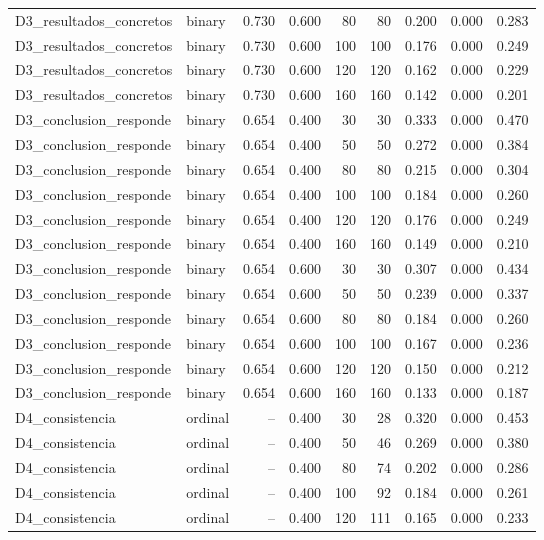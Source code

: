 \begin{table}
{\begin{tabular}{llrrrrrrr}
D3\_resultados\_concretos & binary & 0.730 & 0.600 & 80 & 80 & 0.200 & 0.000 & 0.283 \\
D3\_resultados\_concretos & binary & 0.730 & 0.600 & 100 & 100 & 0.176 & 0.000 & 0.249 \\
D3\_resultados\_concretos & binary & 0.730 & 0.600 & 120 & 120 & 0.162 & 0.000 & 0.229 \\
D3\_resultados\_concretos & binary & 0.730 & 0.600 & 160 & 160 & 0.142 & 0.000 & 0.201 \\
D3\_conclusion\_responde & binary & 0.654 & 0.400 & 30 & 30 & 0.333 & 0.000 & 0.470 \\
D3\_conclusion\_responde & binary & 0.654 & 0.400 & 50 & 50 & 0.272 & 0.000 & 0.384 \\
D3\_conclusion\_responde & binary & 0.654 & 0.400 & 80 & 80 & 0.215 & 0.000 & 0.304 \\
D3\_conclusion\_responde & binary & 0.654 & 0.400 & 100 & 100 & 0.184 & 0.000 & 0.260 \\
D3\_conclusion\_responde & binary & 0.654 & 0.400 & 120 & 120 & 0.176 & 0.000 & 0.249 \\
D3\_conclusion\_responde & binary & 0.654 & 0.400 & 160 & 160 & 0.149 & 0.000 & 0.210 \\
D3\_conclusion\_responde & binary & 0.654 & 0.600 & 30 & 30 & 0.307 & 0.000 & 0.434 \\
D3\_conclusion\_responde & binary & 0.654 & 0.600 & 50 & 50 & 0.239 & 0.000 & 0.337 \\
D3\_conclusion\_responde & binary & 0.654 & 0.600 & 80 & 80 & 0.184 & 0.000 & 0.260 \\
D3\_conclusion\_responde & binary & 0.654 & 0.600 & 100 & 100 & 0.167 & 0.000 & 0.236 \\
D3\_conclusion\_responde & binary & 0.654 & 0.600 & 120 & 120 & 0.150 & 0.000 & 0.212 \\
D3\_conclusion\_responde & binary & 0.654 & 0.600 & 160 & 160 & 0.133 & 0.000 & 0.187 \\
D4\_consistencia & ordinal & -- & 0.400 & 30 & 28 & 0.320 & 0.000 & 0.453 \\
D4\_consistencia & ordinal & -- & 0.400 & 50 & 46 & 0.269 & 0.000 & 0.380 \\
D4\_consistencia & ordinal & -- & 0.400 & 80 & 74 & 0.202 & 0.000 & 0.286 \\
D4\_consistencia & ordinal & -- & 0.400 & 100 & 92 & 0.184 & 0.000 & 0.261 \\
D4\_consistencia & ordinal & -- & 0.400 & 120 & 111 & 0.165 & 0.000 & 0.233 \\

\end{tabular}}
\end{table}
